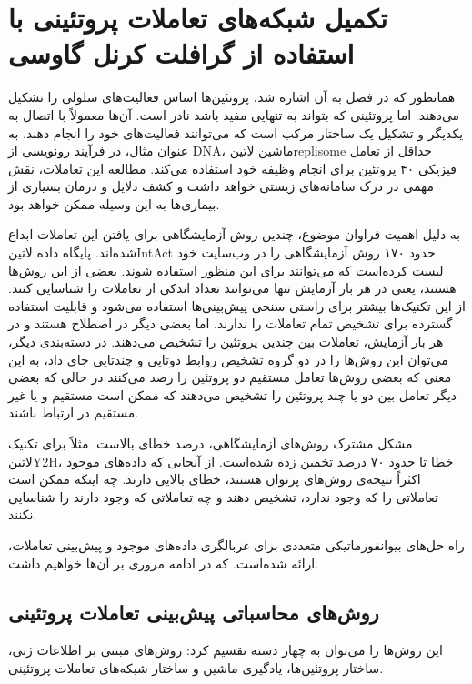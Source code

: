 \chapter{تکمیل شبکه‌های تعاملات پروتئینی با استفاده از گرافلت کرنل گاوسی}\label{chap:network-completion-problem-ppi}
همانطور که در فصل  به آن اشاره شد، پروتئین‌ها اساس فعالیت‌های سلولی را تشکیل می‌دهند. اما پروتئینی که بتواند به تنهایی مفید باشد نادر است. آن‌ها معمولاً با اتصال به یکدیگر و تشکیل یک ساختار مرکب است که می‌توانند فعالیت‌های خود را انجام ‌دهند. به عنوان مثال، در فرآیند رونویسی از DNA، ماشین ‌لاتین{replisome} حداقل از تعامل فیزیکی ۴۰ پروتئین برای انجام وظیفه خود استفاده می‌کند. مطالعه این تعاملات، نقش مهمی در درک سامانه‌های زیستی خواهد داشت و کشف دلایل و درمان بسیاری از بیماری‌ها به این وسیله ممکن خواهد بود.

به دلیل اهمیت فراوان موضوع، چندین روش آزمایشگاهی برای یافتن این تعاملات ابداع شده‌اند. پایگاه داده ‌لاتین{IntAct} حدود ۱۷۰ روش آزمایشگاهی را در وب‌سایت خود لیست کرده‌است که می‌توانند برای این منظور استفاده شوند. بعضی از این روش‌ها  هستند، یعنی در هر بار آزمایش تنها می‌توانند تعداد اندکی از تعاملات را شناسایی کنند. از این تکنیک‌ها بیشتر برای راستی سنجی پیش‌بینی‌ها استفاده می‌شود و قابلیت استفاده گسترده برای تشخیص تمام تعاملات را ندارند. اما بعضی دیگر در اصطلاح  هستند و در هر بار آزمایش، تعاملات بین چندین پروتئین را تشخیص می‌دهند. در دسته‌بندی دیگر، می‌توان این روش‌ها را در دو گروه تشخیص روابط دوتایی و چندتایی جای داد، به این معنی که بعضی روش‌ها تعامل مستقیم دو پروتئین را رصد می‌کنند در حالی که بعضی دیگر تعامل بین دو یا چند پروتئین را تشخیص می‌دهند که ممکن است مستقیم و یا غیر مستقیم در ارتباط باشند.

مشکل مشترک روش‌های آزمایشگاهی، درصد خطای بالاست. مثلاً برای تکنیک ‌لاتین{Y2H}، خطا تا حدود ۷۰ درصد تخمین زده شده‌است. از آنجایی که داده‌های موجود اکثراً نتیجه‌ی روش‌های پرتوان هستند، خطای بالایی دارند. چه اینکه ممکن است تعاملاتی را که وجود ندارد، تشخیص دهند و چه تعاملاتی که وجود دارند را شناسایی نکنند.

راه حل‌های بیوانفورماتیکی متعددی برای غربالگری داده‌های موجود و پیش‌بینی تعاملات، ارائه شده‌است. که در ادامه مروری بر آن‌ها خواهیم داشت.

\section{روش‌های محاسباتی پیش‌بینی تعاملات پروتئینی}
این روش‌ها را می‌توان به چهار دسته تقسیم کرد: روش‌های مبتنی بر اطلاعات ژنی، ساختار پروتئین‌ها، یادگیری ماشین و ساختار شبکه‌های تعاملات پروتئینی.

